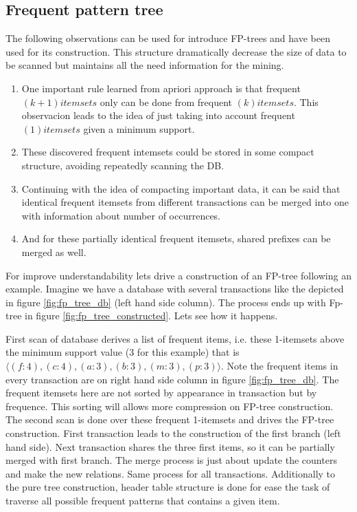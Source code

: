 \subsection{Frequent pattern tree}\label{ss:frequent_pattern_tree}

The following observations can be used for introduce FP-trees and have been used
for its construction. This structure dramatically decrease the size of data to be 
scanned but maintains all the need information for the mining.

\begin{enumerate}[label=\roman*)]
  \item One important rule learned from apriori approach is that frequent
    $(k+1) itemsets$ only can be done from frequent $(k) itemsets$. This observacion
    leads to the idea of just taking into account frequent $(1) itemsets$ given a
    minimum support.
  \item These discovered frequent intemsets could be stored in some compact
    structure, avoiding repeatedly scanning the DB.
  \item Continuing with the idea of compacting important data, it can be said
    that identical frequent itemsets from different transactions can be merged
    into one with information about number of occurrences.
  \item And for these partially identical frequent itemsets, shared prefixes can
    be merged as well.
\end{enumerate}

For improve understandability lets drive a construction of an FP-tree following an
example. Imagine we have a database with several transactions like the depicted
in figure \ref{fig:fp_tree_db} (left hand side column). The process ends up with
Fp-tree in figure \ref{fig:fp_tree_constructed}. Lets see how it happens. 

First scan of database derives a list of frequent items, i.e. these 1-itemsets 
above the minimum support value (3 for this example) that is $\langle
(f:4),(c:4),(a:3),(b:3),(m:3),(p:3) \rangle$. Note the frequent items in every
transaction are on right hand side column in figure \ref{fig:fp_tree_db}. The
frequent itemsets here are not sorted by appearance in transaction but by
frequence. This sorting will allows more compression on FP-tree construction. The 
second scan is done over these frequent 1-itemsets and drives the
FP-tree construction. First transaction leads to the construction of the first
branch (left hand side). Next transaction shares the three first items, so
it can be partially merged with first branch. The merge process is just about
update the counters and make the new relations. Same process for all
transactions. Additionally to the pure tree construction, header table structure 
is done for ease the task of traverse all possible frequent patterns that 
contains a given item. 

